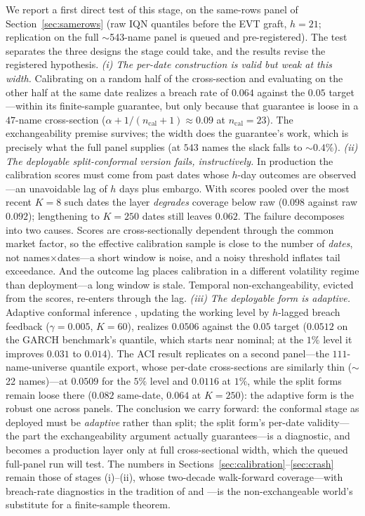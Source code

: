 \documentclass[11pt]{article}
\begin{document}
We report a first direct test of this stage, on the same-rows panel of Section~\ref{sec:samerows} (raw IQN quantiles before the EVT graft, $h=21$; replication on the full $\sim$543-name panel is queued and pre-registered). The test separates the three designs the stage could take, and the results revise the registered hypothesis. \emph{(i) The per-date construction is valid but weak at this width.} Calibrating on a random half of the cross-section and evaluating on the other half at the same date realizes a breach rate of $0.064$ against the $0.05$ target---within its finite-sample guarantee, but only because that guarantee is loose in a $47$-name cross-section ($\alpha + 1/(n_{\mathrm{cal}}+1) \approx 0.09$ at $n_{\mathrm{cal}}=23$). The exchangeability premise survives; the width does the guarantee's work, which is precisely what the full panel supplies (at $543$ names the slack falls to $\sim 0.4\%$). \emph{(ii) The deployable split-conformal version fails, instructively.} In production the calibration scores must come from past dates whose $h$-day outcomes are observed---an unavoidable lag of $h$ days plus embargo. With scores pooled over the most recent $K=8$ such dates the layer \emph{degrades} coverage below raw ($0.098$ against raw $0.092$); lengthening to $K=250$ dates still leaves $0.062$. The failure decomposes into two causes. Scores are cross-sectionally dependent through the common market factor, so the effective calibration sample is close to the number of \emph{dates}, not names$\times$dates---a short window is noise, and a noisy threshold inflates tail exceedance. And the outcome lag places calibration in a different volatility regime than deployment---a long window is stale. Temporal non-exchangeability, evicted from the scores, re-enters through the lag. \emph{(iii) The deployable form is adaptive.} Adaptive conformal inference \citep{gibbs2021aci}, updating the working level by $h$-lagged breach feedback ($\gamma = 0.005$, $K=60$), realizes $0.0506$ against the $0.05$ target ($0.0512$ on the GARCH benchmark's quantile, which starts near nominal; at the $1\%$ level it improves $0.031$ to $0.014$). The ACI result replicates on a second panel---the $111$-name-universe quantile export, whose per-date cross-sections are similarly thin ($\sim$22 names)---at $0.0509$ for the $5\%$ level and $0.0116$ at $1\%$, while the split forms remain loose there ($0.082$ same-date, $0.064$ at $K=250$): the adaptive form is the robust one across panels. The conclusion we carry forward: the conformal stage as deployed must be \emph{adaptive} rather than split; the split form's per-date validity---the part the exchangeability argument actually guarantees---is a diagnostic, and becomes a production layer only at full cross-sectional width, which the queued full-panel run will test. The numbers in Sections~\ref{sec:calibration}--\ref{sec:crash} remain those of stages (i)--(ii), whose two-decade walk-forward coverage---with breach-rate diagnostics in the tradition of \citet{kupiec1995} and \citet{christoffersen1998}---is the non-exchangeable world's substitute for a finite-sample theorem.
\end{document}
